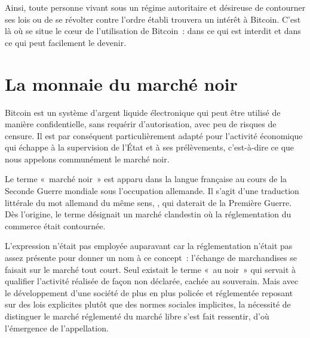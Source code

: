 Ainsi, toute personne vivant sous un régime autoritaire et désireuse de contourner ses lois ou de se révolter contre l'ordre établi trouvera un intérêt à Bitcoin. C'est là où se situe le cœur de l'utilisation de Bitcoin~: dans ce qui est interdit et dans ce qui peut facilement le devenir.

\vspace{-1em}
\section*{La monnaie du marché noir}

Bitcoin est un système d'argent liquide électronique qui peut être utilisé de manière confidentielle, sans requérir d'autorisation, avec peu de risques de censure. Il est par conséquent particulièrement adapté pour l'activité économique qui échappe à la supervision de l'État et à ses prélèvements, c'est-à-dire ce que nous appelons communément le marché noir.


Le terme «~marché noir~» est apparu dans la langue française au cours de la Seconde Guerre mondiale sous l'occupation allemande. Il s'agit d'une traduction littérale du mot allemand du même sens, , qui daterait de la Première Guerre. Dès l'origine, le terme désignait un marché clandestin où la réglementation du commerce était contournée.

L'expression n'était pas employée auparavant car la réglementation n'était pas assez présente pour donner un nom à ce concept~: l'échange de marchandises se faisait sur le marché tout court. Seul existait le terme «~au noir~» qui servait à qualifier l'activité réalisée de façon non déclarée, cachée au souverain. Mais avec le développement d'une société de plus en plus policée et réglementée reposant sur des lois explicites plutôt que des normes sociales implicites, la nécessité de distinguer le marché réglementé du marché libre s'est fait ressentir, d'où l'émergence de l'appellation.

